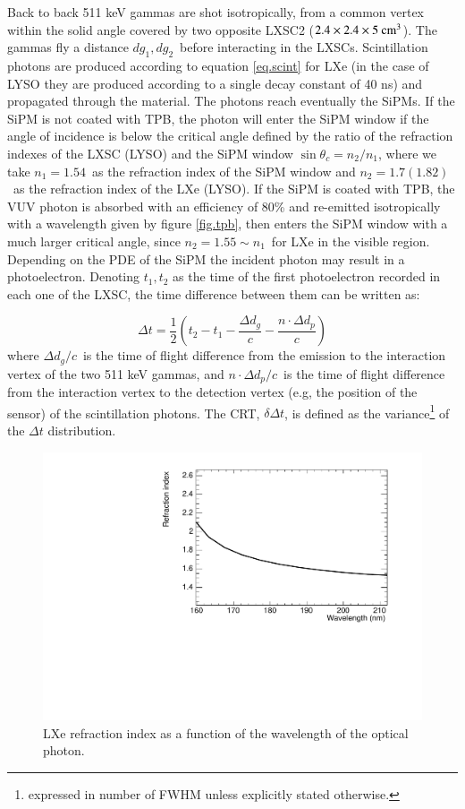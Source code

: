 \documentclass[review]{elsarticle}
\begin{document}
  Back to back 511 keV gammas are shot isotropically, from a common vertex within the solid angle covered by two opposite LXSC2 ($2.4 \times 2.4 \times 5\ {\rm cm^3}$). The gammas fly a distance $dg_1, dg_2$~before interacting in the LXSCs. Scintillation photons are produced according to equation \ref{eq.scint} for LXe (in the case of LYSO they are produced according to a single decay constant of 40 ns) and propagated through the material. The photons reach eventually the SiPMs. If the SiPM is not coated with TPB, the photon will enter the SiPM window if the angle of incidence is below the critical angle defined by the ratio of the refraction indexes of the LXSC (LYSO) and the SiPM window $\sin \theta_c = n_2/n_1$,  where we take $n_1 = 1.54$~as the refraction index of the SiPM window and
  $n_2 = 1.7 (1.82)$~as the refraction index of the LXe (LYSO). If the SiPM is coated with TPB, the 
  VUV photon is absorbed with an efficiency of 80\% and re-emitted isotropically with a wavelength given by figure \ref{fig.tpb}, then enters the SiPM window with a much larger critical angle, since  $n_2 = 1.55 \sim n_1$~for LXe in the visible region. Depending on the PDE of the SiPM the incident photon may result in a photoelectron. Denoting $t_1,t_2$ as the time of the first photoelectron recorded in each one of the LXSC, the time difference between them can be written as:

\begin{equation}
\Delta t = \frac{1}{2}(t_2 - t_1 - \frac{\Delta d_g}{c} - \frac{n \cdot \Delta d_p}{c}) 
\label{eq.CRT}
\end{equation}
%
where $\Delta d_g/c$~is the time of flight difference from the emission to the interaction vertex of the two 511 keV gammas, and $n \cdot \Delta d_p/c$~is the time of flight difference from the interaction vertex to the
detection vertex (e.g, the position of the sensor) of the scintillation photons. The CRT,
$\delta \Delta t$, is defined as the variance\footnote{expressed in number of FWHM unless explicitly stated otherwise.} of the $\Delta t$ distribution. 

\begin{figure}[!bhtp]
	\centering
	\includegraphics[scale=0.6]{../img/LXe_n_lambda.pdf}
	\caption{\label{fig.nlambda} LXe refraction index as a function of the wavelength of the optical photon.}
\end{figure}
\end{document}
